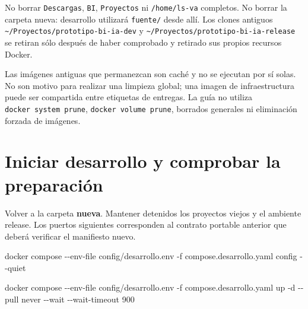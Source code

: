 \documentclass[
  spanish,
  10pt,
  a4paper,
]{article}
\newenvironment{Shaded}{}{}
\newcommand{\AttributeTok}[1]{#1}
\newcommand{\BuiltInTok}[1]{#1}
\newcommand{\ExtensionTok}[1]{#1}
\newcommand{\NormalTok}[1]{#1}
\newcommand{\StringTok}[1]{#1}
\newcommand{\VariableTok}[1]{#1}
\renewenvironment{Shaded}{\begin{snugshade}}{\end{snugshade}}%
\begin{document}
No borrar \texttt{Descargas}, \texttt{BI}, \texttt{Proyectos} ni
\texttt{/home/ls-va} completos. No borrar la carpeta nueva: desarrollo
utilizará \texttt{fuente/} desde allí. Los clones antiguos
\texttt{\textasciitilde{}/Proyectos/prototipo-bi-ia-dev} y
\texttt{\textasciitilde{}/Proyectos/prototipo-bi-ia-release} se retiran
sólo después de haber comprobado y retirado sus propios recursos Docker.

Las imágenes antiguas que permanezcan son caché y no se ejecutan por sí
solas. No son motivo para realizar una limpieza global; una imagen de
infraestructura puede ser compartida entre etiquetas de entregas. La
guía no utiliza \texttt{docker\ system\ prune},
\texttt{docker\ volume\ prune}, borrados generales ni eliminación
forzada de imágenes.

\clearpage

\section{Iniciar desarrollo y comprobar la
preparación}\label{iniciar-desarrollo-y-comprobar-la-preparaciuxf3n}

Volver a la carpeta \textbf{nueva}. Mantener detenidos los proyectos
viejos y el ambiente release. Los puertos siguientes corresponden al
contrato portable anterior que deberá verificar el manifiesto nuevo.

\begin{Shaded}
\end{Shaded}

\begin{Shaded}
\begin{Highlighting}[]
\ExtensionTok{docker}\NormalTok{ compose }\AttributeTok{{-}{-}env{-}file}\NormalTok{ config/desarrollo.env }\AttributeTok{{-}f}\NormalTok{ compose.desarrollo.yaml config }\AttributeTok{{-}{-}quiet}
\end{Highlighting}
\end{Shaded}

\begin{Shaded}
\begin{Highlighting}[]
\ExtensionTok{docker}\NormalTok{ compose }\AttributeTok{{-}{-}env{-}file}\NormalTok{ config/desarrollo.env }\AttributeTok{{-}f}\NormalTok{ compose.desarrollo.yaml up }\AttributeTok{{-}d} \AttributeTok{{-}{-}pull}\NormalTok{ never }\AttributeTok{{-}{-}wait} \AttributeTok{{-}{-}wait{-}timeout}\NormalTok{ 900}
\end{Highlighting}
\end{Shaded}
\end{document}

